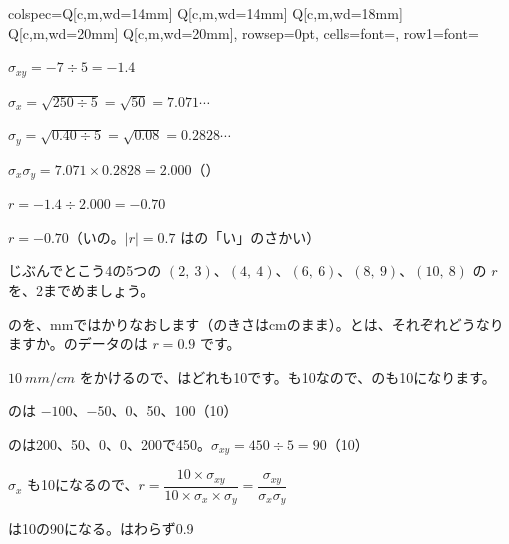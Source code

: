 \begin{reidai}[\R{相関係数}{そう|かん|けい|すう}を\R{求}{もと}める]
\begin{center}
\begin{bktable}{colspec={Q[c,m,wd=14mm] Q[c,m,wd=14mm] Q[c,m,wd=18mm] Q[c,m,wd=20mm] Q[c,m,wd=20mm]}, rowsep=0pt, cells={font=\small}, row{1}={font=\sffamily\bfseries\footnotesize}}
\end{bktable}
\end{center}
\hspace*{2.6\zw}$\sigma_{xy}=-7\div5=-1.4$\par
\hspace*{2.6\zw}$\sigma_x=\sqrt{250\div5}=\sqrt{50}=7.071\cdots$\par
\hspace*{2.6\zw}$\sigma_y=\sqrt{0.40\div5}=\sqrt{0.08}=0.2828\cdots$\par
\hspace*{2.6\zw}$\sigma_x\sigma_y=7.071\times0.2828=2.000$\quad（）\par
\hspace*{2.6\zw}$r=-1.4\div2.000=-0.70$\par
\kotae $r=-0.70$（いの。$|r|=0.7$ はの「い」のさかい）
\end{reidai}

\begin{jibun}
じぶんでとこう4の5つの $(2,\ 3)$、$(4,\ 4)$、$(6,\ 6)$、$(8,\ 9)$、$(10,\ 8)$ の $r$ を、2までめましょう。
\end{jibun}

\begin{reidai}
のを、mmではかりなおします（のきさはcmのまま）。とは、それぞれどうなりますか。のデータのは $r=0.9$ です。\par
\kangaekata $\qty{10}{mm/cm}$ をかけるので、はどれも10です。も10なので、のも10になります。\par
\shiki {}のは $-100$、$-50$、0、50、100（10）\par
\hspace*{2.6\zw}のは200、50、0、0、200で450。$\sigma_{xy}=450\div5=90$（10）\par
\hspace*{2.6\zw}$\sigma_x$ も10になるので、$r=\dfrac{10\times\sigma_{xy}}{10\times\sigma_x\times\sigma_y}=\dfrac{\sigma_{xy}}{\sigma_x\sigma_y}$\par
\kotae {}は10の90になる。はわらず0.9
\end{reidai}


